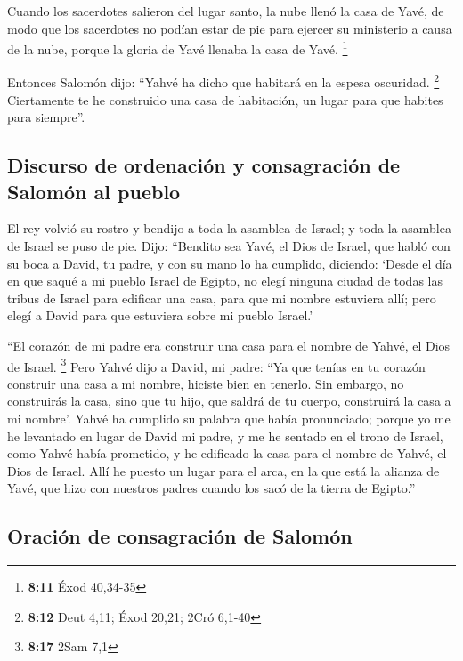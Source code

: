  Cuando los sacerdotes salieron del lugar santo, la nube
llenó la casa de Yavé,  de modo que los sacerdotes no
podían estar de pie para ejercer su ministerio a causa de la nube,
porque la gloria de Yavé llenaba la casa de Yavé. \footnote{\textbf{8:11}
  Éxod 40,34-35}

 Entonces Salomón dijo: ``Yahvé ha dicho que habitará en
la espesa oscuridad. \footnote{\textbf{8:12} Deut 4,11; Éxod 20,21; 2Cró
  6,1-40}  Ciertamente te he construido una casa de
habitación, un lugar para que habites para siempre''.

\hypertarget{discurso-de-ordenaciuxf3n-y-consagraciuxf3n-de-salomuxf3n-al-pueblo}{%
\subsection{Discurso de ordenación y consagración de Salomón al
pueblo}\label{discurso-de-ordenaciuxf3n-y-consagraciuxf3n-de-salomuxf3n-al-pueblo}}

 El rey volvió su rostro y bendijo a toda la asamblea de
Israel; y toda la asamblea de Israel se puso de pie. 
Dijo: ``Bendito sea Yavé, el Dios de Israel, que habló con su boca a
David, tu padre, y con su mano lo ha cumplido, diciendo: 
`Desde el día en que saqué a mi pueblo Israel de Egipto, no elegí
ninguna ciudad de todas las tribus de Israel para edificar una casa,
para que mi nombre estuviera allí; pero elegí a David para que estuviera
sobre mi pueblo Israel.'

 ``El corazón de mi padre era construir una casa para el
nombre de Yahvé, el Dios de Israel. \footnote{\textbf{8:17} 2Sam 7,1}
 Pero Yahvé dijo a David, mi padre: ``Ya que tenías en tu
corazón construir una casa a mi nombre, hiciste bien en tenerlo.
 Sin embargo, no construirás la casa, sino que tu hijo,
que saldrá de tu cuerpo, construirá la casa a mi nombre'.
 Yahvé ha cumplido su palabra que había pronunciado;
porque yo me he levantado en lugar de David mi padre, y me he sentado en
el trono de Israel, como Yahvé había prometido, y he edificado la casa
para el nombre de Yahvé, el Dios de Israel.  Allí he
puesto un lugar para el arca, en la que está la alianza de Yavé, que
hizo con nuestros padres cuando los sacó de la tierra de Egipto.''

\hypertarget{oraciuxf3n-de-consagraciuxf3n-de-salomuxf3n}{%
\subsection{Oración de consagración de
Salomón}\label{oraciuxf3n-de-consagraciuxf3n-de-salomuxf3n}}

